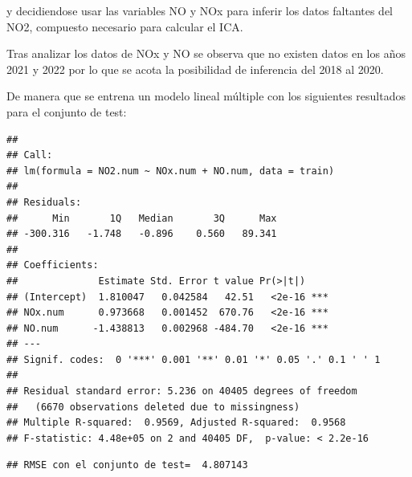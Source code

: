 \documentclass[notspecified,article,submit,moreauthors,pdftex]{Definitions/mdpi}
\begin{document}
y decidiendose usar las variables NO y NOx para inferir los datos
faltantes del NO2, compuesto necesario para calcular el ICA.

Tras analizar los datos de NOx y NO se observa que no existen datos en
los años 2021 y 2022 por lo que se acota la posibilidad de inferencia
del 2018 al 2020.

De manera que se entrena un modelo lineal múltiple con los siguientes
resultados para el conjunto de test:

\begin{verbatim}
## 
## Call:
## lm(formula = NO2.num ~ NOx.num + NO.num, data = train)
## 
## Residuals:
##      Min       1Q   Median       3Q      Max 
## -300.316   -1.748   -0.896    0.560   89.341 
## 
## Coefficients:
##              Estimate Std. Error t value Pr(>|t|)    
## (Intercept)  1.810047   0.042584   42.51   <2e-16 ***
## NOx.num      0.973668   0.001452  670.76   <2e-16 ***
## NO.num      -1.438813   0.002968 -484.70   <2e-16 ***
## ---
## Signif. codes:  0 '***' 0.001 '**' 0.01 '*' 0.05 '.' 0.1 ' ' 1
## 
## Residual standard error: 5.236 on 40405 degrees of freedom
##   (6670 observations deleted due to missingness)
## Multiple R-squared:  0.9569, Adjusted R-squared:  0.9568 
## F-statistic: 4.48e+05 on 2 and 40405 DF,  p-value: < 2.2e-16
\end{verbatim}

\begin{verbatim}
## RMSE con el conjunto de test=  4.807143
\end{verbatim}
\end{document}
